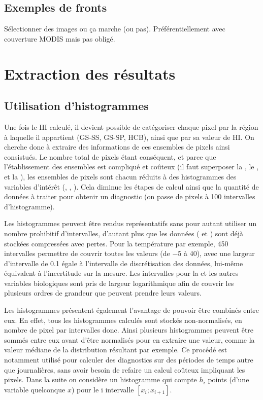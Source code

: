\documentclass[index]{subfiles}
\begin{document}
\subsection{Exemples de fronts}
\label{sec:HI-exemples}

Sélectionner des images ou ça marche (ou pas).
Préférentiellement avec couverture MODIS mais pas obligé.

\section{Extraction des résultats}
\label{sec:extraction-res}

\subsection{Utilisation d'histogrammes}
\label{sec:extraction-hist}

Une fois le HI calculé, il devient possible de catégoriser chaque pixel par la région à laquelle il appartient (GS-SS, GS-SP, HCB), ainsi que par sa valeur de HI\@.
On cherche donc à extraire des informations de ces ensembles de pixels ainsi consistués.
Le nombre total de pixels étant conséquent, et parce que l'établissement des ensembles est compliqué et coûteux (il faut superposer la , le , et la ), les ensembles de pixels sont chacun réduits à des histogrammes des variables d'intérêt (, , ).
Cela diminue les étapes de calcul ainsi que la quantité de données à traiter pour obtenir un diagnostic (on passe de  pixels à \num{100} intervalles d'histogramme).

Les histogrammes peuvent être rendus représentatifs sans pour autant utiliser un nombre prohibitif d'intervalles, d'autant plus que les données ( et ) sont déjà stockées compressées avec pertes. Pour la température par exemple, 450 intervalles permettre de couvrir toutes les valeurs (de \qty{-5}{\dC} à \qty{40}{\dC}), avec une largeur d'intervalle de \qty{0.1}{\dC} égale à l'intervalle de discrétisation des données, lui-même équivalent à l'incertitude sur la mesure.
Les intervalles pour la  et les autres variables biologiques sont pris de largeur logarithmique afin de couvrir les plusieurs ordres de grandeur que peuvent prendre leurs valeurs.

Les histogrammes présentent également l'avantage de pouvoir être combinés entre eux.
En effet, tous les histogrammes calculés sont stockés non-normalisés, en nombre de pixel par intervalles donc. Ainsi plusieurs histogrammes peuvent être sommés entre eux avant d'être normalisés pour en extraire une valeur, comme la valeur médiane de la distribution résultant par exemple.
Ce procédé est notamment utilisé pour calculer des diagnostics sur des périodes de temps autre que journalières, sans avoir besoin de refaire un calcul coûteux impliquant les pixels.
Dans la suite on considère un histogramme qui compte \(h_i\) points (d'une variable quelconque \(x\)) pour le i\ieme{} intervalle \(\left[x_i; x_{i+1} \right]\).
\end{document}
